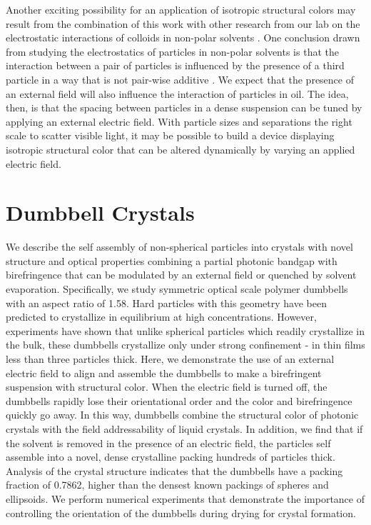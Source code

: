 Another exciting possibility for an application of isotropic structural colors may result from the combination of this work with other research from our lab on the electrostatic interactions of colloids in non-polar solvents \cite{Sainis:2008, Sainis:2008:2, Merrill:2009}.
One conclusion drawn from studying the electrostatics of particles in non-polar solvents is that the interaction between a pair of particles is influenced by the presence of a third particle in a way that is not pair-wise additive \cite{Merrill:2009}.
We expect that the presence of an external field will also influence the interaction of particles in oil.
The idea, then, is that the spacing between particles in a dense suspension can be tuned by applying an external electric field.
With particle sizes and separations the right scale to scatter visible light, it may be possible to build a device displaying isotropic structural color that can be altered dynamically by varying an applied electric field.


\section{Dumbbell Crystals}
We describe the self assembly of non-spherical particles into crystals with novel structure and optical properties combining a partial photonic bandgap with birefringence that can be  modulated by an external field or quenched by solvent evaporation. 
Specifically, we study symmetric optical scale polymer dumbbells with an aspect ratio of 1.58. 
Hard particles with this geometry have been predicted to crystallize in equilibrium at high concentrations.
However, experiments have shown that unlike spherical particles which readily crystallize in the bulk, these dumbbells crystallize only under strong confinement - in thin films less than three particles thick.
Here, we demonstrate the use of an external electric field to align and assemble the dumbbells to make a birefringent suspension with structural color.
When the electric field is turned off, the dumbbells rapidly lose their orientational order and the color and birefringence quickly go away.
In this way, dumbbells combine the structural color of photonic crystals with the field addressability of liquid crystals.
In addition, we find that if the solvent is removed in the presence of an electric field, the particles self assemble into a novel, dense crystalline packing hundreds of particles thick.
Analysis of the crystal structure indicates that the dumbbells have a packing fraction of 0.7862, higher than the densest known packings of spheres and ellipsoids.
We perform numerical experiments that demonstrate the importance of controlling the orientation of the dumbbells during drying for crystal formation.

